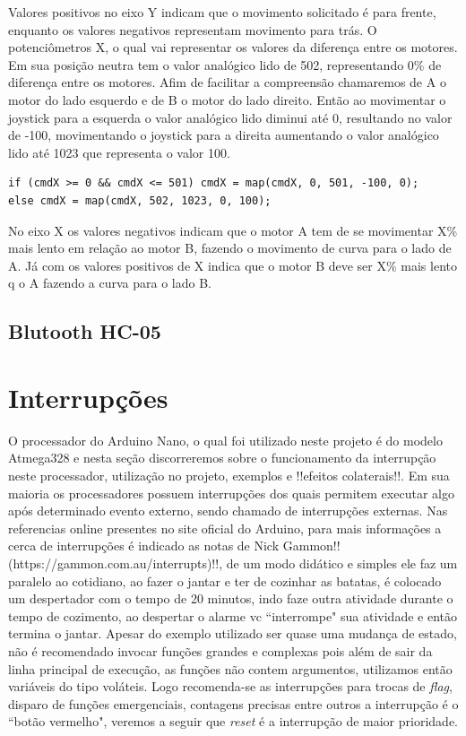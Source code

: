 \documentclass[a4paper,12pt,portuguese]{ufms-cpcx}
\begin{document}
Valores positivos no eixo Y indicam que o movimento solicitado é para frente, enquanto os valores negativos representam movimento para trás.
O potenciômetros X, o qual vai representar os valores da diferença entre os motores. Em sua posição neutra tem o valor analógico lido de 502, representando 0\% de diferença entre os motores. Afim de facilitar a compreensão chamaremos de A o motor do lado esquerdo e de B o motor do lado direito. Então ao movimentar o joystick para a esquerda o valor analógico lido diminui até 0, resultando no valor de -100, movimentando o joystick para a direita aumentando o valor analógico lido até 1023 que representa o valor 100. 
\begin{lstlisting}
if (cmdX >= 0 && cmdX <= 501) cmdX = map(cmdX, 0, 501, -100, 0);
else cmdX = map(cmdX, 502, 1023, 0, 100);
\end{lstlisting}
No eixo X os valores negativos indicam que o motor A tem de se movimentar X\% mais lento em relação ao motor B, fazendo o movimento de curva para o lado de A. Já com os valores positivos de X indica que o motor B deve ser X\% mais lento q o A fazendo a curva para o lado B.

\section{Blutooth HC-05}\label{bthc05}


\chapter{Interrupções}
O processador do Arduino Nano, o qual foi utilizado neste projeto é do modelo Atmega328 e nesta seção discorreremos sobre o funcionamento da interrupção neste processador, utilização no projeto, exemplos e !!efeitos colaterais!!.
Em sua maioria os processadores possuem interrupções dos quais permitem executar algo após determinado evento externo, sendo chamado de interrupções externas. Nas referencias online presentes no site oficial do Arduino, para mais informações a cerca de interrupções é indicado as notas de Nick Gammon!!(https://gammon.com.au/interrupts)!!, de um modo didático e simples ele faz um paralelo ao cotidiano, ao fazer o jantar e ter de cozinhar as batatas, é colocado um despertador com o tempo de 20 minutos, indo faze outra atividade durante o tempo de cozimento, ao despertar o alarme vc ``interrompe" sua atividade e então termina o jantar. Apesar do exemplo utilizado ser quase uma mudança de estado, não é recomendado invocar funções grandes e complexas pois além de sair da linha principal de execução, as funções não contem argumentos, utilizamos então variáveis do tipo voláteis. Logo recomenda-se as interrupções para trocas de \textit{flag}, disparo de funções emergenciais, contagens precisas entre outros a interrupção é o ``botão vermelho", veremos a seguir que \textit{reset} é a interrupção de maior prioridade.
\end{document}
